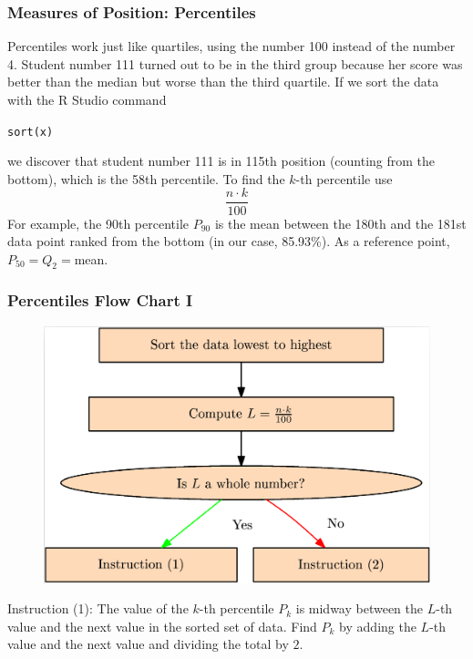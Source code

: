 \documentclass[xcolor=dvipsnames]{beamer}
\begin{document}
\begin{frame}
  \frametitle{Measures of Position: Percentiles}
Percentiles work just like quartiles, using the number 100 instead of
the number 4. Student number 111 turned out to be in the third
group because her score was better than the median but worse than the
third quartile. If we sort the data with the R Studio command
\begin{alltt}
sort(x)
\end{alltt}
we discover that student number 111 is in 115th position (counting
from the bottom), which is the 58th percentile. To find the $k$-th
percentile use
\begin{equation}
  \label{eq:phaecoab}
  \frac{n\cdot{}k}{100}
\end{equation}
For example, the 90th percentile $P_{90}$ is the mean between the 180th and the
181st data point ranked from the bottom (in our case, 85.93\%). As a
reference point, $P_{50}=Q_{2}=$mean.
\end{frame}

\begin{frame}
  \frametitle{Percentiles Flow Chart I}
\begin{figure}[h]
\includegraphics[scale=.15]{./diagrams/percentile.png}
\end{figure}
Instruction (1): The value of the $k$-th percentile $P_{k}$ is midway
between the $L$-th value and the next value in the sorted set of data.
Find $P_{k}$ by adding the $L$-th value and the next value and
dividing the total by $2$.
\end{frame}
\end{document}

